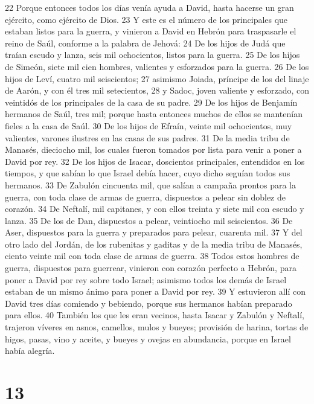22 Porque entonces todos los días venía ayuda a David, hasta hacerse un gran ejército, como ejército de Dios.
23 Y este es el número de los principales que estaban listos para la guerra, y vinieron a David en Hebrón para traspasarle el reino de Saúl, conforme a la palabra de Jehová:
24 De los hijos de Judá que traían escudo y lanza, seis mil ochocientos, listos para la guerra.
25 De los hijos de Simeón, siete mil cien hombres, valientes y esforzados para la guerra.
26 De los hijos de Leví, cuatro mil seiscientos;
27 asimismo Joiada, príncipe de los del linaje de Aarón, y con él tres mil setecientos,
28 y Sadoc, joven valiente y esforzado, con veintidós de los principales de la casa de su padre.
29 De los hijos de Benjamín hermanos de Saúl, tres mil; porque hasta entonces muchos de ellos se mantenían fieles a la casa de Saúl.
30 De los hijos de Efraín, veinte mil ochocientos, muy valientes, varones ilustres en las casas de sus padres.
31 De la media tribu de Manasés, dieciocho mil, los cuales fueron tomados por lista para venir a poner a David por rey.
32 De los hijos de Isacar, doscientos principales, entendidos en los tiempos, y que sabían lo que Israel debía hacer, cuyo dicho seguían todos sus hermanos.
33 De Zabulón cincuenta mil, que salían a campaña prontos para la guerra, con toda clase de armas de guerra, dispuestos a pelear sin doblez de corazón.
34 De Neftalí, mil capitanes, y con ellos treinta y siete mil con escudo y lanza.
35 De los de Dan, dispuestos a pelear, veintiocho mil seiscientos.
36 De Aser, dispuestos para la guerra y preparados para pelear, cuarenta mil.
37 Y del otro lado del Jordán, de los rubenitas y gaditas y de la media tribu de Manasés, ciento veinte mil con toda clase de armas de guerra.
38 Todos estos hombres de guerra, dispuestos para guerrear, vinieron con corazón perfecto a Hebrón, para poner a David por rey sobre todo Israel; asimismo todos los demás de Israel estaban de un mismo ánimo para poner a David por rey.
39 Y estuvieron allí con David tres días comiendo y bebiendo, porque sus hermanos habían preparado para ellos.
40 También los que les eran vecinos, hasta Isacar y Zabulón y Neftalí, trajeron víveres en asnos, camellos, mulos y bueyes; provisión de harina, tortas de higos, pasas, vino y aceite, y bueyes y ovejas en abundancia, porque en Israel había alegría.


\chapter{13}



